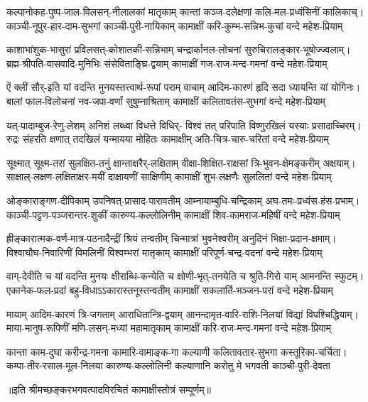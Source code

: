 

\fourlineindentedshloka
{कल्पानोकह-पुष्प-जाल-विलसन्-नीलालकां मातृकाम्}
{कान्तां कञ्ज-दलेक्षणां कलि-मल-प्रध्वंसिनीं कालिकाच्।}
{काञ्ची-नूपुर-हार-दाम-सुभगां काञ्ची-पुरी-नायिकाम्}
{कामाक्षीं करि-कुम्भ-सन्निभ-कुचां वन्दे महेश-प्रियाम्}%

\fourlineindentedshloka
{काशाभांशुक-भासुरां प्रविलसत्-कोशातकी-सन्निभाम्}
{चन्द्रार्कानल-लोचनां सुरुचिरालङ्कार-भूषोज्ज्वलाम्।}
{ब्रह्म-श्रीपति-वासवादि-मुनिभिः संसेविताङ्घ्रि-द्वयाम्}
{कामाक्षीं गज-राज-मन्द-गमनां वन्दे महेश-प्रियाम्}%

\fourlineindentedshloka
{ऐं क्लीं सौर्-इति यां वदन्ति मुनयस्तत्त्वार्थ-रूपां पराम्}
{वाचाम् आदिम-कारणं हृदि सदा ध्यायन्ति यां योगिनः।}
{बालां फाल-विलोचनां नव-जपा-वर्णां सुषुम्नाश्रिताम्}
{कामाक्षीं कलितावतंस-सुभगां वन्दे महेश-प्रियाम्}%

\fourlineindentedshloka
{यत्-पादाम्बुज-रेणु-लेशम् अनिशं लब्ध्वा विधत्ते विधिर्-}
{विश्वं तत् परिपाति विष्णुरखिलं यस्याः प्रसादाच्चिरम्।}
{रुद्रः संहरति क्षणात् तदखिलं यन्मायया मोहितः}
{कामाक्षीम् अति-चित्र-चारु-चरितां वन्दे महेश-प्रियाम्}%

\fourlineindentedshloka
{सूक्ष्मात् सूक्ष्म-तरां सुलक्षित-तनुं क्षान्ताक्षरैर्-लक्षिताम्}
{वीक्षा-शिक्षित-राक्षसां त्रि-भुवन-क्षेमङ्करीम् अक्षयाम्।}
{साक्षाल्-लक्षण-लक्षिताक्षर-मयीं दाक्षायणीं साक्षिणीम्}
{कामाक्षीं शुभ-लक्षणैः सुललितां वन्दे महेश-प्रियाम्}%

\fourlineindentedshloka
{ओङ्काराङ्गण-दीपिकाम् उपनिषत्-प्रासाद-पारावतीम्}
{आम्नायाम्बुधि-चन्द्रिकाम् अघ-तमः-प्रध्वंस-हंस-प्रभाम्।}
{काञ्ची-पट्टण-पञ्जरान्तर-शुकीं कारुण्य-कल्लोलिनीम्}
{कामाक्षीं शिव-कामराज-महिषीं वन्दे महेश-प्रियाम्}%

\fourlineindentedshloka
{ह्रीङ्कारात्मक-वर्ण-मात्र-पठनादैन्द्रीं श्रियं तन्वतीम्}
{चिन्मात्रां भुवनेश्वरीम् अनुदिनं भिक्षा-प्रदान-क्षमाम्।}
{विश्वाघौघ-निवारिणीं विमलिनीं विश्वम्भरां मातृकाम्}
{कामाक्षीं परिपूर्ण-चन्द्र-वदनां वन्दे महेश-प्रियाम्}%

\fourlineindentedshloka
{वाग्-देवीति च यां वदन्ति मुनयः क्षीराब्धि-कन्येति च}
{क्षोणी-भृत्-तनयेति च श्रुति-गिरो याम् आमनन्ति स्फुटम्।}
{एकानेक-फल-प्रदां बहु-विधाऽऽकारास्तनूस्तन्वतीम्}
{कामाक्षीं सकलार्ति-भञ्जन-परां वन्दे महेश-प्रियाम्}%

\fourlineindentedshloka
{मायाम् आदिम-कारणं त्रि-जगताम् आराधितान्त्रि-द्वयाम्}
{आनन्दामृत-वारि-राशि-निलयां विद्यां विपश्चिद्धियाम्।}
{माया-मानुष-रूपिणीं मणि-लसन्-मध्यां महामातृकाम्}
{कामाक्षीं करि-राज-मन्द-गमनां वन्दे महेश-प्रियाम्}%

\fourlineindentedshloka
{कान्ता काम-दुघा करीन्द्र-गमना कामारि-वामाङ्क-गा}
{कल्याणी कलितावतार-सुभगा कस्तूरिका-चर्चिता।}
{कम्पा-तीर-रसाल-मूल-निलया कारुण्य-कल्लोलिनी}
{कल्याणानि करोतु मे भगवती काञ्ची-पुरी-देवता}%

॥इति श्रीमच्छङ्करभगवत्पादविरचितं कामाक्षीस्तोत्रं सम्पूर्णम्॥

